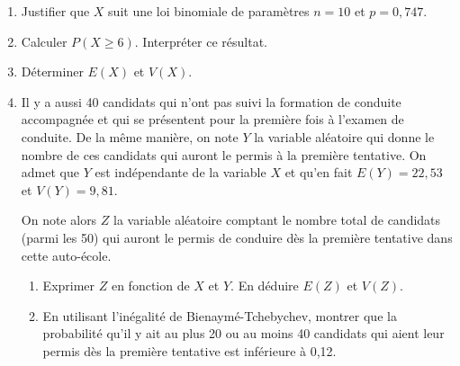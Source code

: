 \documentclass[10pt]{article}
\begin{document}
		\begin{enumerate}
			\item Justifier que $X$ suit une loi binomiale de paramètres $n=10$ et $p=0,747$.

			\item Calculer $P(X \geqslant 6)$. Interpréter ce résultat.

			\item Déterminer $E(X)$ et $V(X)$.

			\item Il y a aussi 40 candidats qui n'ont pas suivi la formation de conduite accompagnée et qui se présentent pour la première fois à l'examen de conduite. De la même manière, on note $Y$ la variable aléatoire qui donne le nombre de ces candidats qui auront le permis à la première tentative. On admet que $Y$ est indépendante de la variable $X$ et qu'en fait $E(Y)=22,53$ et $V(Y)=9,81$.

			\medskip

			On note alors $Z$ la variable aléatoire comptant le nombre total de candidats (parmi les 50) qui auront le permis de conduire dès la première tentative dans cette auto-école.

			\medskip

			\begin{enumerate}
				\item Exprimer $Z$ en fonction de $X$ et $Y$. En déduire $E(Z)$ et $V(Z)$.

				\item En utilisant l'inégalité de Bienaymé-Tchebychev, montrer que la probabilité qu'il y ait au plus 20 ou au moins  40 candidats qui aient leur permis dès la première tentative est inférieure à 0,12.
			\end{enumerate}
		\end{enumerate}

\bigskip
\end{document}
